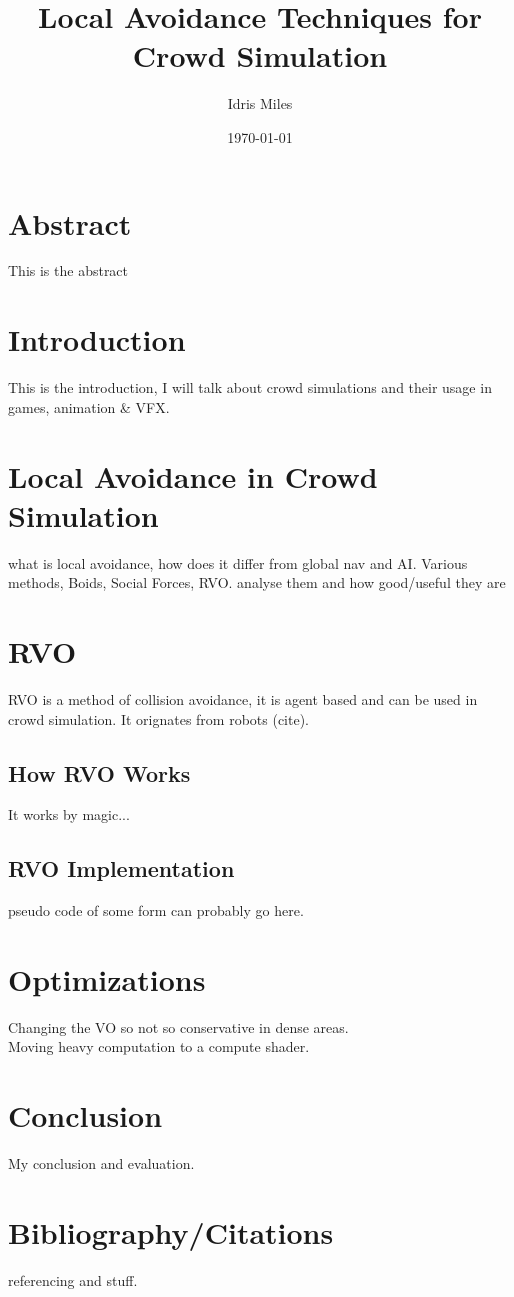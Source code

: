 \documentclass[a4paper,twocolumn]{article}
\author{Idris Miles}
\title{Local Avoidance Techniques for Crowd Simulation}
\date{\today}
\begin{document}
\maketitle

\hline
\section*{Abstract}
This is the abstract \\
\hline
\section{Introduction}
This is the introduction, I will talk about crowd simulations and their usage in games, animation & VFX.
\newpage

\section{Local Avoidance in Crowd Simulation}
what is local avoidance, how does it differ from global nav and AI.
Various methods, Boids, Social Forces, RVO. analyse them and how good/useful they are
\\
\section{RVO}
RVO  is a method of collision avoidance, it is agent based and can be used in crowd  simulation.
It orignates from robots (cite).
\subsection{How RVO Works}
It works by magic...
\subsection{RVO Implementation}
pseudo code of some form can probably go here.
\newpage

\section{Optimizations}
Changing the VO so not so conservative in dense areas.\\
Moving heavy computation to a compute shader.\\
\section{Conclusion}
My conclusion and evaluation.\\
\newpage

\section{Bibliography/Citations}
referencing and stuff. \\
\end{document}
